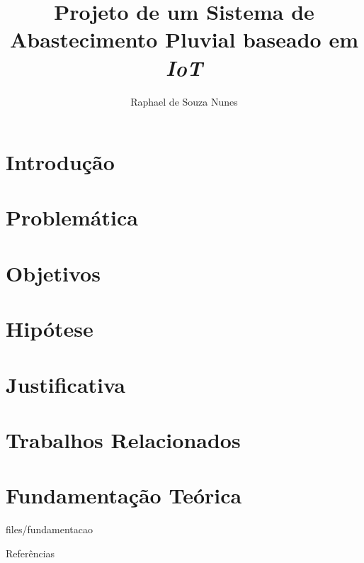 \documentclass[11pt]{beamer}
\title[Trabalho de Conclusão de Curso]{Projeto de um Sistema de Abastecimento Pluvial baseado em \textit{IoT}}
\author[Nunes, R. De S.]{Raphael de Souza Nunes}
\begin{document}


\section{Introdução} 


\section{Problemática}

\section{Objetivos}



\section{Hipótese}

\section{Justificativa}

\section{Trabalhos  Relacionados}

\section {Fundamentação Teórica}
 {files/fundamentacao}



\nocite{*}
\begin{frame}[allowframebreaks]{Referências}	


\end{frame}
\end{document}
